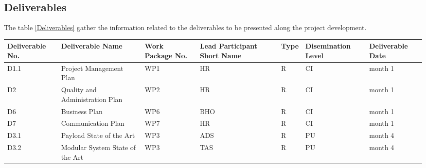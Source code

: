 \pagebreak



\subsection{Deliverables}
\label{deliverables}
The table \ref{Deliverables} gather the information related to the deliverables to be presented along the project development. 

\begin{longtable}[H]{p{1.8cm} >{\raggedright\arraybackslash}p{2.5cm} p{1.3cm} p{1.8cm} p{0.8cm} p{2.1cm} p{1.8cm}}
	\toprule[2pt]
	
	\textbf{Deliverable No.} & \textbf{Deliverable Name} & \textbf{Work Package No.} & \textbf{Lead Participant Short Name} & \textbf{Type} & \textbf{Disemination Level} & \textbf{Deliverable Date} \\
	
	\midrule[1.5pt] 
	\endhead
	
	D1.1 & Project Management Plan & WP1 & HR & R & CI & month 1  \vspace{0.2cm} \\
	
	\midrule
	
	D2 & Quality and Administration Plan & WP2 & HR & R & CI & month 1  \vspace{0.2cm} \\
	
	\midrule

	D6 & Business Plan & WP6 & BHO & R & CI & month 1  \vspace{0.2cm} \\
	
	\midrule
	
	D7 & Communication Plan & WP7 & HR & R & CI & month 1  \vspace{0.2cm} \\

	\midrule

 	D3.1 & Payload State of the Art & WP3 & ADS & R & PU & month 4  \vspace{0.2cm} \\

 	\midrule

	D3.2 & Modular System State of the Art  & WP3 & TAS & R & PU & month 4  \vspace{0.2cm} \\
	
	\midrule
	

\end{longtable}
